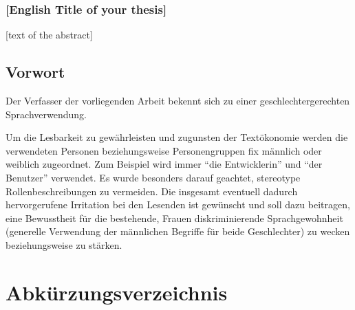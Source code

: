 \documentclass[a4paper,12pt,twoside]{scrreprt}
\begin{document}
\subsection*{[English Title of your thesis]}

[text of the abstract]

\newpage
\section*{Vorwort}
\label{sec:vorwort}

Der Verfasser der vorliegenden Arbeit bekennt sich zu einer geschlechtergerechten Sprachverwendung.

Um die Lesbarkeit zu gewährleisten und zugunsten der Textökonomie werden die verwendeten Personen beziehungsweise Personengruppen fix männlich oder weiblich zugeordnet. Zum Beispiel wird immer \enquote{die Entwicklerin} und \enquote{der Benutzer} verwendet. Es wurde besonders darauf geachtet, stereotype Rollenbeschreibungen zu vermeiden. Die insgesamt eventuell dadurch hervorgerufene Irritation bei den Lesenden ist gewünscht und soll dazu beitragen, eine Bewusstheit für die bestehende, Frauen diskriminierende Sprachgewohnheit (generelle Verwendung der männlichen Begriffe für beide Geschlechter) zu wecken beziehungsweise zu stärken.

\cleardoublepage %
\tableofcontents

\clearpage
{}
{}
\listoffigures

\clearpage
{}
{}
\listoflistings

\clearpage
{}
{}
\listoftables

\clearpage
{}
{}
\chapter*{Abkürzungsverzeichnis}
\begin{acronym}
\end{acronym}
\end{document}
